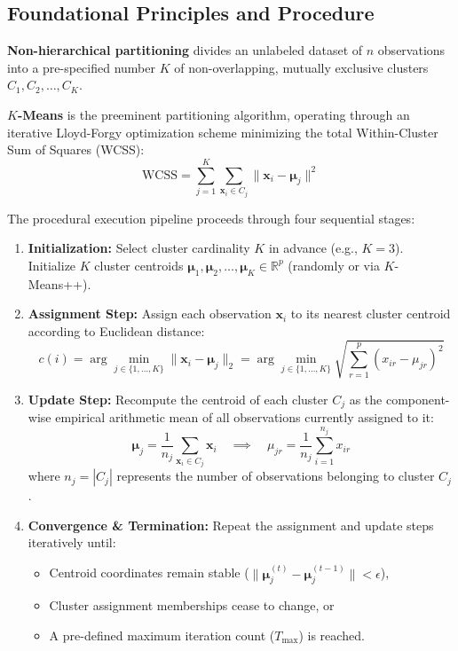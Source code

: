 \subsection{Foundational Principles and Procedure}
\textbf{Non-hierarchical partitioning} divides an unlabeled dataset of $n$ observations into a pre-specified number $K$ of non-overlapping, mutually exclusive clusters $C_1, C_2, \dots, C_K$.

\textbf{$K$-Means} is the preeminent partitioning algorithm, operating through an iterative Lloyd-Forgy optimization scheme minimizing the total Within-Cluster Sum of Squares (WCSS):
\begin{equation}
    \text{WCSS} = \sum_{j=1}^K \sum_{\mathbf{x}_i \in C_j} \|\mathbf{x}_i - \boldsymbol{\mu}_j\|^2
\end{equation}

The procedural execution pipeline proceeds through four sequential stages:
\begin{enumerate}
    \item \textbf{Initialization:} Select cluster cardinality $K$ in advance (e.g., $K = 3$). Initialize $K$ cluster centroids $\boldsymbol{\mu}_1, \boldsymbol{\mu}_2, \dots, \boldsymbol{\mu}_K \in \mathbb{R}^p$ (randomly or via $K$-Means++).
    \item \textbf{Assignment Step:} Assign each observation $\mathbf{x}_i$ to its nearest cluster centroid according to Euclidean distance:
    \begin{equation}
        c(i) = \arg\min_{j \in \{1, \dots, K\}} \|\mathbf{x}_i - \boldsymbol{\mu}_j\|_2 = \arg\min_{j \in \{1, \dots, K\}} \sqrt{\sum_{r=1}^p (x_{ir} - \mu_{jr})^2}
    \end{equation}
    \item \textbf{Update Step:} Recompute the centroid of each cluster $C_j$ as the component-wise empirical arithmetic mean of all observations currently assigned to it:
    \begin{equation}
        \boldsymbol{\mu}_j = \frac{1}{n_j} \sum_{\mathbf{x}_i \in C_j} \mathbf{x}_i \quad \implies \quad \mu_{jr} = \frac{1}{n_j} \sum_{i=1}^{n_j} x_{ir}
    \end{equation}
    where $n_j = |C_j|$ represents the number of observations belonging to cluster $C_j$.
    \item \textbf{Convergence \& Termination:} Repeat the assignment and update steps iteratively until:
    \begin{itemize}
        \item Centroid coordinates remain stable ($\|\boldsymbol{\mu}_j^{(t)} - \boldsymbol{\mu}_j^{(t-1)}\| < \epsilon$),
        \item Cluster assignment memberships cease to change, or
        \item A pre-defined maximum iteration count ($T_{\max}$) is reached.
    \end{itemize}
\end{enumerate}

